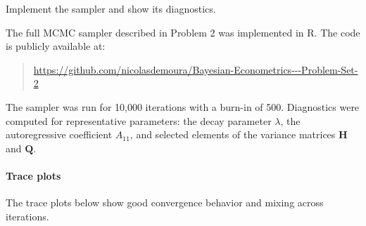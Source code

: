 Implement the sampler and show its diagnostics.

The full MCMC sampler described in Problem 2 was implemented in R. The code is publicly available at:

\begin{quote}
\url{https://github.com/nicolasdemoura/Bayesian-Econometrics---Problem-Set-2}
\end{quote}

The sampler was run for 10,000 iterations with a burn-in of 500. Diagnostics were computed for representative parameters: the decay parameter $\lambda$, the autoregressive coefficient $A_{11}$, and selected elements of the variance matrices $\mathbf{H}$ and $\mathbf{Q}$.

\paragraph{Trace plots}
The trace plots below show good convergence behavior and mixing across iterations.

